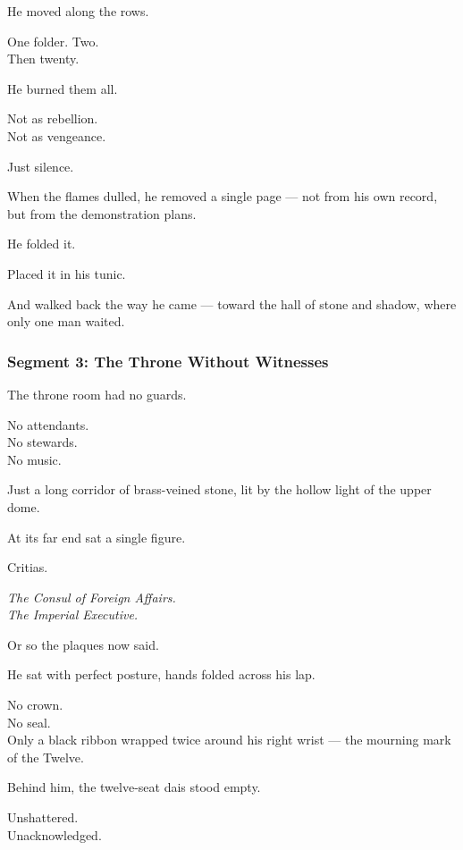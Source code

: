 \documentclass[9pt]{article}
\begin{document}
\vspace{1em}

He moved along the rows.

One folder. Two.\\
Then twenty.

He burned them all.

Not as rebellion.\\
Not as vengeance.

Just silence.

\vspace{1em}

When the flames dulled, he removed a single page — not from his own record, but from the demonstration plans.

He folded it.

Placed it in his tunic.

And walked back the way he came — toward the hall of stone and shadow, where only one man waited.

\newpage

\subsubsection*{Segment 3: The Throne Without Witnesses}

The throne room had no guards.

No attendants.\\
No stewards.\\
No music.

Just a long corridor of brass-veined stone, lit by the hollow light of the upper dome.

At its far end sat a single figure.

Critias.

\textit{The Consul of Foreign Affairs.}\\
\textit{The Imperial Executive.}

Or so the plaques now said.

\vspace{1em}

He sat with perfect posture, hands folded across his lap.

No crown.\\
No seal.\\
Only a black ribbon wrapped twice around his right wrist — the mourning mark of the Twelve.

Behind him, the twelve-seat dais stood empty.

Unshattered.\\
Unacknowledged.
\end{document}
